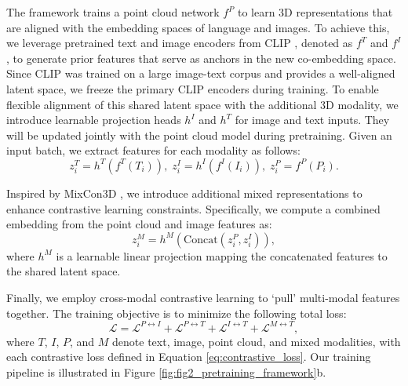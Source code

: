 The framework trains a point cloud network \( f^P \) to learn 3D representations that are aligned with the embedding spaces of language and images. To achieve this, we leverage pretrained text and image encoders from CLIP \cite{openclip}, denoted as \( f^T \) and \( f^I \), to generate prior features that serve as anchors in the new co-embedding space. Since CLIP \cite{2dclip} was trained on a large image-text corpus and provides a well-aligned latent space, we freeze the primary CLIP \cite{2dclip} encoders during training. To enable flexible alignment of this shared latent space with the additional 3D modality, we introduce learnable projection heads \( h^I \) and \( h^T \) for image and text inputs. They will be updated jointly with the point cloud model during pretraining. Given an input batch, we extract features for each modality as follows:
\begin{equation}
    z^T_i = h^T \left( f^T(T_i) \right), \;
    z^I_i = h^I \left( f^I(I_i) \right), \;
    z^P_i = f^P(P_i).
\end{equation}

Inspired by MixCon3D \cite{mixcon3d}, we introduce additional mixed representations to enhance contrastive learning constraints. Specifically, we compute a combined embedding from the point cloud and image features as:
\begin{equation}
    z^M_i = h^M \left( \mathrm{Concat}(z^P_i, z^I_i) \right),
\end{equation}
where \( h^M \) is a learnable linear projection mapping the concatenated features to the shared latent space.

Finally, we employ cross-modal contrastive learning to `pull' multi-modal features together. The training objective is to minimize the following total loss:
\begin{equation}
    \mathcal{L} = \mathcal{L}^{P \leftrightarrow I} + \mathcal{L}^{P \leftrightarrow T} + \mathcal{L}^{I \leftrightarrow T} + \mathcal{L}^{M \leftrightarrow T},
\end{equation}
where \( T \), \( I \), \( P \), and \( M \) denote text, image, point cloud, and mixed modalities, with each contrastive loss defined in Equation \ref{eq:contrastive_loss}. Our training pipeline is illustrated in Figure \ref{fig:fig2_pretraining_framework}b.

